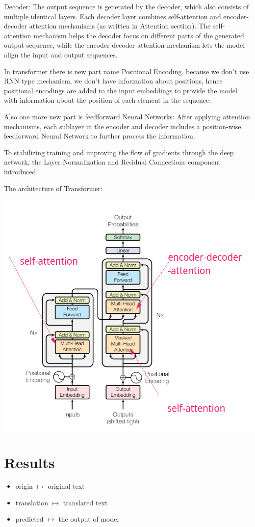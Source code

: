 \documentclass{article}
\begin{document}
Decoder: The output sequence is generated by the decoder, which also consists of multiple identical layers. Each decoder layer combines self-attention and encoder-decoder attention mechanisms (as written in Attention section). The self-attention mechanism helps the decoder focus on different parts of the generated output sequence, while the encoder-decoder attention mechanism lets the model align the input and output sequences.

In transformer there is new part name Positional Encoding, because we don't use RNN type mechanism, we don't have information about positions, hence positional encodings are added to the input embeddings to provide the model with information about the position of each element in the sequence.

Also one more new part is feedforward Neural Networks: After applying attention mechanisms, each sublayer in the encoder and decoder includes a position-wise feedforward Neural Network to further process the information.

To stabilizing training and improving the flow of gradients through the deep network, the Layer Normalization and Residual Connections component introduced.

The architecture of Transformer:

\includegraphics[scale=1]{figures/Transformer.png}

\section{Results}
\begin{itemize}
    \item origin $\mapsto$ original text
    \item translation $\mapsto$ translated text
    \item predicted $\mapsto$ the output of model
\end{itemize}
\end{document}
